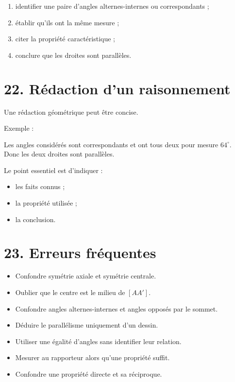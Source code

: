 \begin{methode}
\begin{enumerate}
\item identifier une paire d'angles alternes-internes ou correspondants ;
\item établir qu'ils ont la même mesure ;
\item citer la propriété caractéristique ;
\item conclure que les droites sont parallèles.
\end{enumerate}
\end{methode}

\section{22. Rédaction d'un raisonnement}

Une rédaction géométrique peut être concise.

Exemple :
\begin{remarque}
Les angles considérés sont correspondants et ont tous deux pour mesure $64^\circ$. Donc les deux droites sont parallèles.
\end{remarque}

Le point essentiel est d'indiquer :
\begin{itemize}
\item les faits connus ;
\item la propriété utilisée ;
\item la conclusion.
\end{itemize}

\section{23. Erreurs fréquentes}

\begin{itemize}
\item Confondre symétrie axiale et symétrie centrale.
\item Oublier que le centre est le milieu de $[AA']$.
\item Confondre angles alternes-internes et angles opposés par le sommet.
\item Déduire le parallélisme uniquement d'un dessin.
\item Utiliser une égalité d'angles sans identifier leur relation.
\item Mesurer au rapporteur alors qu'une propriété suffit.
\item Confondre une propriété directe et sa réciproque.
\end{itemize}

